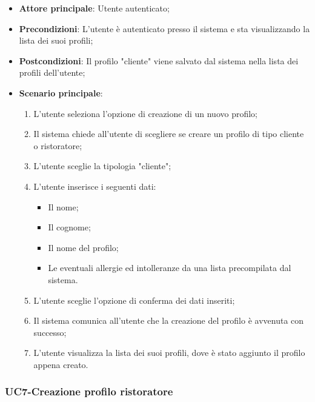 \begin{itemize}
\item \textbf{Attore principale}: Utente autenticato;
\item \textbf{Precondizioni}: L'utente è autenticato presso il sistema e sta visualizzando la lista dei suoi profili;
\item \textbf{Postcondizioni}: Il profilo "cliente" viene salvato dal sistema nella lista dei profili dell'utente;
\item \textbf{Scenario principale}:
\begin{enumerate}
\item L'utente seleziona l'opzione di creazione di un nuovo profilo;
\item Il sistema chiede all'utente di scegliere se creare un profilo di tipo cliente o ristoratore;
\item L'utente sceglie la tipologia "cliente";
\item L'utente inserisce i seguenti dati:
\begin{itemize}
\item Il nome;
\item Il cognome;
\item Il nome del profilo;
\item Le eventuali allergie ed intolleranze da una lista precompilata dal sistema.
\end{itemize}
\item L'utente sceglie l'opzione di conferma dei dati inseriti;
\item Il sistema comunica all'utente che la creazione del profilo è avvenuta con successo;
\item L'utente visualizza la lista dei suoi profili, dove è stato aggiunto il profilo appena creato.
\end{enumerate}
\end{itemize}

\subsubsection{UC7-Creazione profilo ristoratore}


